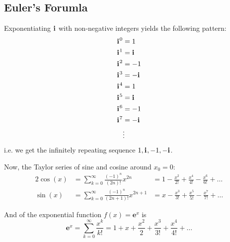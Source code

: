 \documentclass{article}
\newcommand{\iu}{\mathbf{i}\mkern1mu}
\newcommand{\Eu}[1]{\mathbf{e}^{#1}}
\begin{document}
\subsection{Euler's Forumla}
Exponentiating $\iu$ with non-negative integers yields the following pattern:
\begin{align*}
	\iu^0 & = 1    \\
	\iu^1 & = \iu  \\
	\iu^2 & = -1   \\
	\iu^3 & = -\iu \\
	\iu^4 & = 1    \\
	\iu^5 & = \iu  \\
	\iu^6 & = -1   \\
	\iu^7 & = -\iu \\
	      & \vdots
\end{align*}
i.e. we get the infinitely repeating sequence ${1, \iu, -1, -\iu}$.

Now, the Taylor series of sine and cosine around $x_{0}=0$:
\begin{alignat}{2}
	\cos(x) & = \sum\limits_{k=0}^{\infty} \frac{(-1)^{n}}{(2n)!}x^{2n}     & = 1 - \frac{x^2}{2!} + \frac{x^4}{4!} - \frac{x^6}{6!} + \dots \\
	\sin(x) & = \sum\limits_{k=0}^{\infty} \frac{(-1)^{n}}{(2n+1)!}x^{2n+1} & = x-\frac{x^3}{3!}+\frac{x^5}{5!} - \frac{x^7}{7!} + \dots
	\label{eq:cosine_and_sine_taylor}
\end{alignat}

And of the exponential function $f(x)=\Eu{x}$ is
\begin{equation}
	\Eu{x} = \sum\limits_{k=0}^{\infty} \frac{x^{k}}{k!} = 1 + x + \frac{x^2}{2} + \frac{x^3}{3!} + \frac{x^4}{4!} + \dots
	\label{eq:exp_taylor}
\end{equation}
\end{document}
